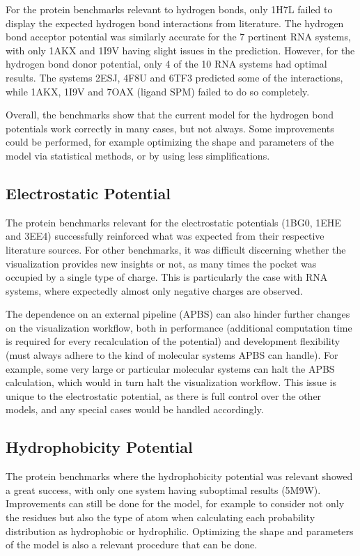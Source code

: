     For the protein benchmarks relevant to hydrogen bonds, only 1H7L failed to display the expected hydrogen bond interactions from literature. The hydrogen bond acceptor potential was similarly accurate for the 7 pertinent RNA systems, with only 1AKX and 1I9V having slight issues in the prediction. However, for the hydrogen bond donor potential, only 4 of the 10 RNA systems had optimal results. The systems 2ESJ, 4F8U and 6TF3 predicted some of the interactions, while 1AKX, 1I9V and 7OAX (ligand SPM) failed to do so completely.

    Overall, the benchmarks show that the current model for the hydrogen bond potentials work correctly in many cases, but not always. Some improvements could be performed, for example optimizing the shape and parameters of the model via statistical methods, or by using less simplifications.

  \subsection{Electrostatic Potential}
    The protein benchmarks relevant for the electrostatic potentials (1BG0, 1EHE and 3EE4) successfully reinforced what was expected from their respective literature sources. For other benchmarks, it was difficult discerning whether the visualization provides new insights or not, as many times the pocket was occupied by a single type of charge. This is particularly the case with RNA systems, where expectedly almost only negative charges are observed.

    The dependence on an external pipeline (APBS) can also hinder further changes on the visualization workflow, both in performance (additional computation time is required for every recalculation of the potential) and development flexibility (must always adhere to the kind of molecular systems APBS can handle). For example, some very large or particular molecular systems can halt the APBS calculation, which would in turn halt the visualization workflow. This issue is unique to the electrostatic potential, as there is full control over the other models, and any special cases would be handled accordingly.

  \subsection{Hydrophobicity Potential}
    The protein benchmarks where the hydrophobicity potential was relevant showed a great success, with only one system having suboptimal results (5M9W). Improvements can still be done for the model, for example to consider not only the residues but also the type of atom when calculating each probability distribution as hydrophobic or hydrophilic. Optimizing the shape and parameters of the model is also a relevant procedure that can be done.


